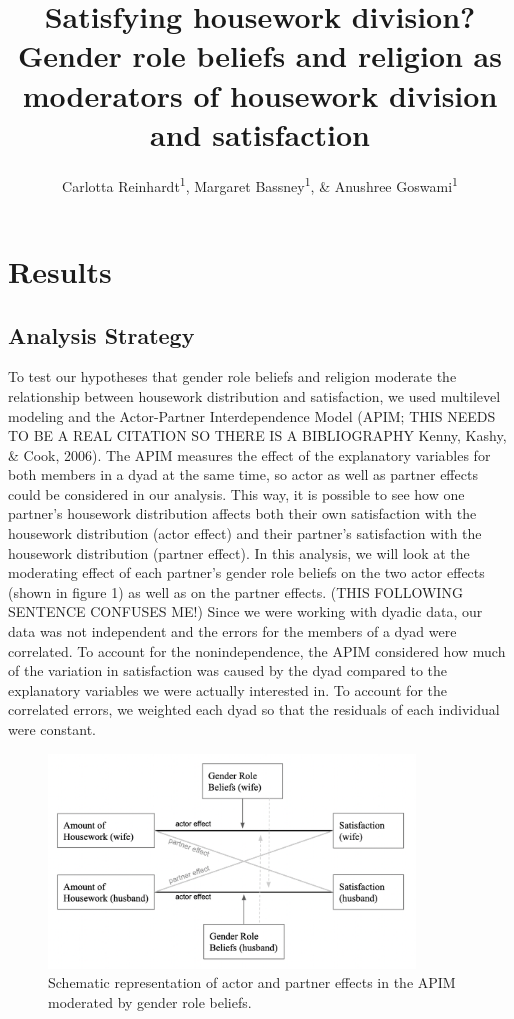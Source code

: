 \documentclass[
  man,floatsintext]{apa6}
\title{Satisfying housework division? Gender role beliefs and religion as moderators of housework division and satisfaction}
\author{Carlotta Reinhardt\textsuperscript{1}, Margaret Bassney\textsuperscript{1}, \& Anushree Goswami\textsuperscript{1}}
\date{}
\affiliation{\vspace{0.5cm}\textsuperscript{1} Smith College}
\begin{document}
\maketitle

\hypertarget{results}{%
\section{Results}\label{results}}

\hypertarget{analysis-strategy}{%
\subsection{Analysis Strategy}\label{analysis-strategy}}

To test our hypotheses that gender role beliefs and religion moderate the relationship between housework distribution and satisfaction, we used multilevel modeling and the Actor-Partner Interdependence Model (APIM; THIS NEEDS TO BE A REAL CITATION SO THERE IS A BIBLIOGRAPHY Kenny, Kashy, \& Cook, 2006). The APIM measures the effect of the explanatory variables for both members in a dyad at the same time, so actor as well as partner effects could be considered in our analysis. This way, it is possible to see how one partner's housework distribution affects both their own satisfaction with the housework distribution (actor effect) and their partner's satisfaction with the housework distribution (partner effect). In this analysis, we will look at the moderating effect of each partner's gender role beliefs on the two actor effects (shown in figure 1) as well as on the partner effects. (THIS FOLLOWING SENTENCE CONFUSES ME!) Since we were working with dyadic data, our data was not independent and the errors for the members of a dyad were correlated. To account for the nonindependence, the APIM considered how much of the variation in satisfaction was caused by the dyad compared to the explanatory variables we were actually interested in. To account for the correlated errors, we weighted each dyad so that the residuals of each individual were constant.



\begin{figure}
\includegraphics[width=3.83in]{APIM} \caption{Schematic representation of actor and partner effects in the APIM moderated by gender role beliefs.}\label{fig:unnamed-chunk-3}
\end{figure}
\end{document}
